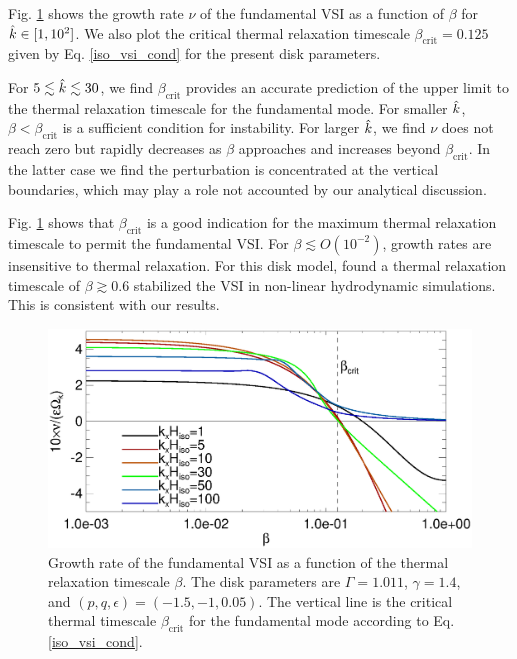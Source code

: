 Fig. \ref{bcrit_compare1} shows the growth rate $\nu$ of the
fundamental VSI as a function of $\beta$ for $\hat{k}\in[1,10^2]$. We
also plot the critical thermal relaxation timescale
$\beta_\mathrm{crit}=0.125$ given by Eq. \ref{iso_vsi_cond} for the present
disk parameters.

For $5\lesssim\hat{k}\lesssim30$, we find $\beta_\mathrm{crit}$ provides an
accurate prediction of the upper limit to the thermal relaxation 
timescale for  the fundamental mode. For smaller $\hat{k}$,
$\beta<\beta_\mathrm{crit}$ is a sufficient condition for
instability. For larger $\hat{k}$, we find $\nu$ does not reach zero but
rapidly decreases as $\beta$ approaches and increases beyond
$\beta_\mathrm{crit}$. In the latter case we find the perturbation is
concentrated at the vertical boundaries, which may play a role not
accounted by our analytical discussion. 

Fig. \ref{bcrit_compare1} shows that 
$\beta_\mathrm{crit}$ is a good indication for the maximum
thermal relaxation timescale to permit the fundamental VSI. For
$\beta\lesssim O(10^{-2})$, growth rates are insensitive to thermal
relaxation. For this disk model, \citeauthor{nelson13}
found a thermal relaxation timescale of $\beta\gtrsim 0.6$ stabilized
the VSI in non-linear hydrodynamic simulations. This is consistent
with our results.   


 \begin{figure}
   \includegraphics[width=\linewidth]{figures/bcrit_compare} 
   \caption{Growth rate of the fundamental VSI as
     a function of the thermal relaxation timescale $\beta$. The disk
     parameters are $\Gamma=1.011$, $\gamma=1.4$, and 
     $(p,q,\epsilon)=(-1.5,-1,0.05)$. The vertical line
     is the critical thermal timescale $\beta_\mathrm{crit}$ for the
     fundamental mode according to Eq. \ref{iso_vsi_cond}. 
     \label{bcrit_compare1}}   
 \end{figure} 

